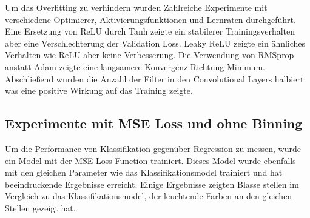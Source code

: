 Um das Overfitting zu verhindern wurden Zahlreiche Experimente mit verschiedene Optimierer, Aktivierungsfunktionen und Lernraten durchgeführt.
Eine Ersetzung von ReLU durch Tanh zeigte ein stabilerer Trainingsverhalten aber eine Verschlechterung der Validation Loss. Leaky ReLU zeigte 
ein ähnliches Verhalten wie ReLU aber keine Verbesserung. Die Verwendung von RMSprop anstatt Adam zeigte eine langsamere Konvergenz Richtung Minimum.
Abschließend wurden die Anzahl der Filter in den Convolutional Layers halbiert was eine positive Wirkung auf das Training zeigte.   

\subsection{Experimente mit MSE Loss und ohne Binning}
Um die Performance von Klassifikation gegenüber Regression zu messen, wurde ein Model mit der MSE Loss Function trainiert. Dieses Model
wurde ebenfalls mit den gleichen Parameter wie das Klassifikationsmodel trainiert und hat beeindruckende Ergebnisse erreicht. Einige Ergebnisse
zeigten Blasse stellen im Vergleich zu das Klassifikationsmodel, der leuchtende Farben an den gleichen Stellen gezeigt hat.

